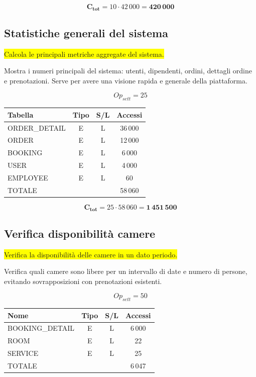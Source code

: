 \documentclass[a4paper,12pt]{report}
\begin{document}
$$\mathbf{C_{tot}} = 10 \cdot 42\,000 = \mathbf{420\,000}$$

\subsection*{Statistiche generali del sistema} \label{op6}
\colorbox{yellow}{Calcola le principali metriche aggregate del sistema.}

Mostra i numeri principali del sistema: utenti, dipendenti, ordini,
dettagli ordine e prenotazioni. Serve per avere una visione rapida e
generale della piattaforma.

$$Op_{sett} = 25$$

\begin{table}[H]
  \centering
  \small
  \renewcommand{\arraystretch}{1.15}
  \begin{tabularx}{0.7\textwidth}{|X|c|c|c|}
    \hline
    \rowcolor{gray!20}
    \textbf{Tabella} & \textbf{Tipo} & \textbf{S/L} & \textbf{Accessi} \\
    \hline
    ORDER\_DETAIL & E & L & 36\,000 \\
    ORDER & E & L & 12\,000\\
    BOOKING & E & L & 6\,000 \\
    USER & E & L & 4\,000 \\
    EMPLOYEE & E & L & 60 \\
    \hline
    \rowcolor{gray!20}
    TOTALE & & & 58\,060 \\
    \hline
  \end{tabularx}
  \vspace{-1em}
\end{table}

$$\mathbf{C_{tot}} = 25 \cdot 58\,060 = \mathbf{1\,451\,500}$$

\subsection*{Verifica disponibilità camere} \label{op7}
\colorbox{yellow}{Verifica la disponibilità delle camere in un dato periodo.}

Verifica quali camere sono libere per un intervallo di date e numero
di persone, evitando sovrapposizioni con prenotazioni esistenti.

$$Op_{sett} = 50$$

\begin{table}[H]
  \centering
  \small
  \renewcommand{\arraystretch}{1.15}
  \begin{tabularx}{0.7\textwidth}{|X|c|c|c|}
    \hline
    \rowcolor{gray!20}
    \textbf{Nome} & \textbf{Tipo} & \textbf{S/L} &\textbf{Accessi} \\
    \hline
    BOOKING\_DETAIL & E & L & 6\,000 \\
    ROOM & E & L & 22 \\
    SERVICE & E & L & 25 \\
    \hline
    \rowcolor{gray!20}
    TOTALE & & & 6\,047 \\
    \hline
  \end{tabularx}
  \vspace{-1em}
\end{table}
\end{document}
